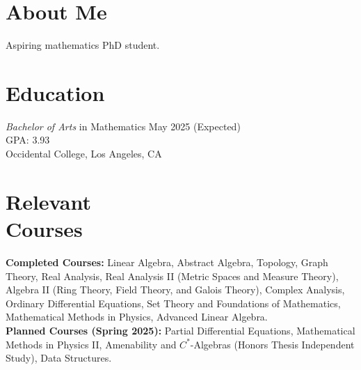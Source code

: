 \documentclass[margin, 12pt]{res} %
\begin{document}
\begin{resume}

\section{\sc About Me}
Aspiring mathematics PhD student.

\section{\sc Education}

{\sl Bachelor of Arts} in Mathematics \hfill May 2025 (Expected) \\
GPA: 3.93\\
Occidental College, Los Angeles, CA 
\section{\sc Relevant \\ Courses}

\textbf{Completed Courses:} Linear Algebra, Abstract Algebra, Topology, Graph Theory, Real Analysis, Real Analysis II (Metric Spaces and Measure Theory), Algebra II (Ring Theory, Field Theory, and Galois Theory), Complex Analysis, Ordinary Differential Equations, Set Theory and Foundations of Mathematics, Mathematical Methods in Physics, Advanced Linear Algebra. \\

\textbf{Planned Courses (Spring 2025):} Partial Differential Equations, Mathematical Methods in Physics II, Amenability and $C^{\ast}$-Algebras (Honors Thesis Independent Study), Data Structures.

\end{resume}
\end{document}
